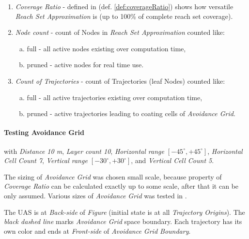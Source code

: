 \begin{enumerate}
    \item\emph{Coverage Ratio} - defined in (def. \ref{def:coverageRatio}) shows how versatile \emph{Reach Set Approximation} is (up to 100\% of complete reach set coverage). 
    
    \item\emph{Node count} - count of Nodes in \emph{Reach Set Approximation} counted like:
    \begin{enumerate}[a.]
        \item full -  all active nodes existing over computation time,
        \item pruned - active nodes for real time use.
    \end{enumerate}
    
    \item\emph{Count of Trajectories} - count of Trajectories (leaf Nodes) counted like:
    \begin{enumerate}[a.]
        \item full -  all active trajectories existing over computation time,
        \item pruned - active trajectories leading to coating cells of \emph{Avoidance Grid}.
    \end{enumerate}
\end{enumerate}


\paragraph{Testing Avoidance Grid}  with \emph{Distance 10 m}, \emph{Layer count 10}, \emph{Horizontal range $[-45^\circ,+45^\circ]$}, \emph{Horizontal Cell Count 7}, \emph{Vertical range $[-30^\circ,+30^\circ]$}, and \emph{Vertical Cell Count 5}. 

\begin{note}
    The sizing of \emph{Avoidance Grid} was chosen small scale, because property of \emph{Coverage Ratio} can be calculated exactly up to some scale, after that it can be only assumed. Various sizes of \emph{Avoidance Grid} was tested in \cite{gomola2017probabilistic}.
\end{note}

The UAS is at \emph{Back-side} of \emph{Figure} (initial state is at all \emph{Trajectory Origins}). The \emph{black dashed line} marks \emph{Avoidance Grid} space boundary. Each trajectory has its own color and ends at \emph{Front-side} of \emph{Avoidance Grid Boundary}.

